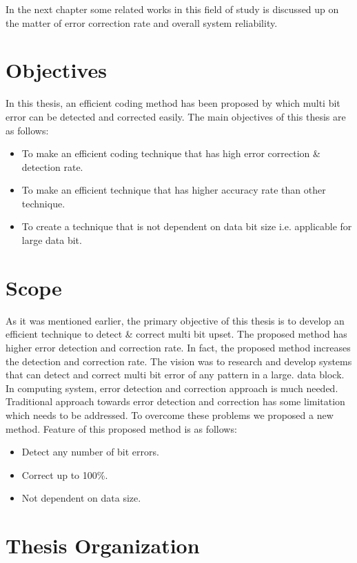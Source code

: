 \documentclass[12pt,a4paper]{report}
\begin{document}
In the next chapter some related works in this field of study is discussed up on the matter of error correction rate and overall system reliability.
\section{Objectives}
 
In this thesis, an efficient coding method has been proposed by which multi bit error can be detected and corrected easily. The main objectives of this thesis are as follows:

\begin{itemize}
  \item To make an efficient coding technique that has high error correction \& detection rate.
  \item To make an efficient technique that has higher accuracy rate than other technique.
  \item To create a technique that is not dependent on data bit size i.e. applicable for large data bit.
\end{itemize}


\section{Scope}
As it was mentioned earlier, the primary objective of this thesis is to develop an efficient technique to detect \& correct multi bit upset. The proposed method has higher error detection and correction rate. In fact, the proposed method increases the detection and correction rate. The vision was to research and develop systems that can detect and correct multi bit error of any pattern in a large.
data block.\\

In computing system, error detection and correction approach is much needed. Traditional approach towards error detection and correction has some limitation which needs to be addressed. To overcome these problems we proposed a new method. Feature of this proposed method is as follows:

\begin{itemize}
\item Detect any number of bit errors.
\item Correct up to 100\%.
\item Not dependent on data size.
\end{itemize}


\section{Thesis Organization}
\end{document}
